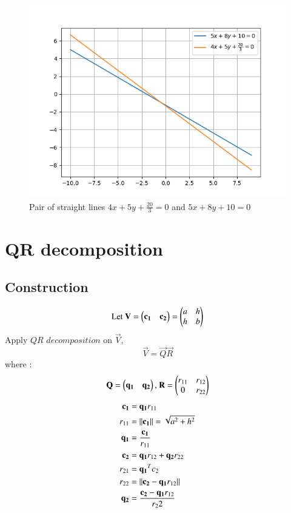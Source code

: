 \documentclass[journal,12pt,twocolumn]{IEEEtran}
\begin{document}
\begin{figure}[h]
	\centering
	\includegraphics[width=\columnwidth]{fig/figure_2.png}
	\caption{Pair of straight lines $4x + 5y + \frac{20}{3} = 0$ and $5x + 8y + 10 = 0$}
	\label{fig:figure2}
\end{figure}
\section{QR decomposition}
\subsection{Construction}

\begin{equation}\label{eq28}
	\text{Let } \mathbf{V} = \begin{pmatrix}\mathbf{c_1} & \mathbf{c_2}\end{pmatrix} = \begin{pmatrix}a & h\\h & b\end{pmatrix}
\end{equation}
Apply $\textit{QR decomposition}$ on $\vec{V}$, 
\begin{equation}\label{eq29}
	\vec{V} = \vec{Q}\vec{R}
\end{equation}
where :
\begin{align}
	\label{eq30}\mathbf{Q} = \begin{pmatrix}\mathbf{q_1} & \mathbf{q_2}\end{pmatrix} \text{, }
	\mathbf{R} = \begin{pmatrix}r_{11} & r_{12}\\0 & r_{22}\end{pmatrix}
\end{align}
\begin{align}
	\label{eq32}\mathbf{c_1} &= \mathbf{q_1}r_{11}\\
	\label{eq33}r_{11} &= \left\lVert\mathbf{c_1}\right\rVert = \sqrt{a^2 + h^2}\\
	\label{eq34}\mathbf{q_1} &= \frac{\mathbf{c_1}}{r_{11}}\\
	\label{eq35}\mathbf{c_2} &= \mathbf{q_1}r_{12} + \mathbf{q_2}r_{22}\\
	\label{eq36}r_{21} &= \mathbf{q_1}^Tc_2\\
	\label{eq37}r_{22} &= \left\lVert\mathbf{c_2} - \mathbf{q_{1}}r_{12}\right\rVert\\
	\label{eq38}\mathbf{q_2} &= \frac{\mathbf{c_2} - \mathbf{q_{1}}r_{12}}{r_22}
\end{align}
\end{document}
